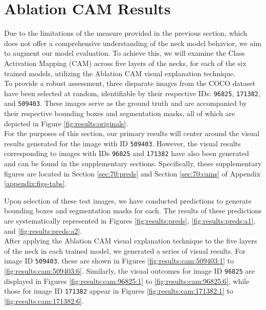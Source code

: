 \section{Ablation CAM Results}
Due to the limitations of the measure provided in the previous section, which does not offer a comprehensive understanding of the neck model behavior, we aim to augment our model evaluation. To achieve this, we will examine the Class Activation Mapping (CAM) across five layers of the necks, for each of the six trained models, utilizing the Ablation CAM visual explanation technique.\\

To provide a robust assessment, three disparate images from the COCO dataset have been selected at random, identifiable by their respective IDs: \texttt{96825}, \texttt{171382}, and \texttt{509403}. These images serve as the ground truth and are accompanied by their respective bounding boxes and segmentation masks, all of which are depicted in Figure \ref{fig:results:originals}.\\

For the purposes of this section, our primary results will center around the visual results generated for the image with ID \texttt{509403}. However, the visual results corresponding to images with IDs \texttt{96825} and \texttt{171382} have also been generated and can be found in the supplementary sections. Specifically, these supplementary figures are located in Section \ref{sec:70:preds} and Section \ref{sec:70:cams} of Appendix \ref{appendix:figs-tabs}.

Upon selection of these test images, we have conducted predictions to generate bounding boxes and segmentation masks for each. The results of these predictions are systematically represented in Figures \ref{fig:results:preds}, \ref{fig:results:preds:a1}, and \ref{fig:results:preds:a2}.\\

After applying the Ablation CAM visual explanation technique to the five layers of the neck in each trained model, we generated a series of visual results. For image ID \texttt{509403}, these are shown in Figures \ref{fig:results:cam:509403:1} to \ref{fig:results:cam:509403:6}. Similarly, the visual outcomes for image ID \texttt{96825} are displayed in Figures \ref{fig:results:cam:96825:1} to \ref{fig:results:cam:96825:6}, while those for image ID \texttt{171382} appear in Figures \ref{fig:results:cam:171382:1} to \ref{fig:results:cam:171382:6}.


